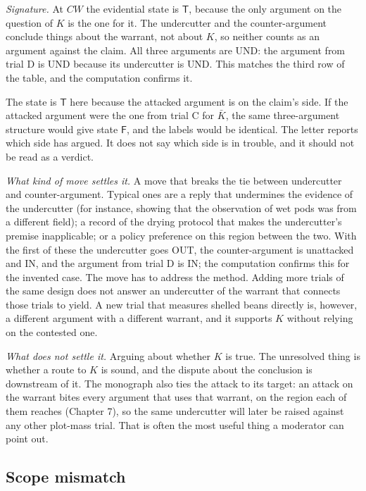 \documentclass[11pt]{article}
\newcommand{\IN}{\textsf{IN}}
\newcommand{\UND}{\textsf{UND}}
\newcommand{\OUT}{\textsf{OUT}}
\begin{document}
\emph{Signature.} At $CW$ the evidential state is $\mathsf T$, because the only argument on the question of $K$ is the one for it. The undercutter and the counter-argument conclude things about the warrant, not about $K$, so neither counts as an argument against the claim. All three arguments are \UND{}: the argument from trial D is \UND{} because its undercutter is \UND{}. This matches the third row of the table, and the computation confirms it.

The state is $\mathsf T$ here because the attacked argument is on the claim's side. If the attacked argument were the one from trial C for $\bar K$, the same three-argument structure would give state $\mathsf F$, and the labels would be identical. The letter reports which side has argued. It does not say which side is in trouble, and it should not be read as a verdict.

\emph{What kind of move settles it.} A move that breaks the tie between undercutter and counter-argument. Typical ones are a reply that undermines the evidence of the undercutter (for instance, showing that the observation of wet pods was from a different field); a record of the drying protocol that makes the undercutter's premise inapplicable; or a policy preference on this region between the two. With the first of these the undercutter goes \OUT{}, the counter-argument is unattacked and \IN{}, and the argument from trial D is \IN{}; the computation confirms this for the invented case. The move has to address the method. Adding more trials of the same design does not answer an undercutter of the warrant that connects those trials to yield. A new trial that measures shelled beans directly is, however, a different argument with a different warrant, and it supports $K$ without relying on the contested one.

\emph{What does not settle it.} Arguing about whether $K$ is true. The unresolved thing is whether a route to $K$ is sound, and the dispute about the conclusion is downstream of it. The monograph also ties the attack to its target: an attack on the warrant bites every argument that uses that warrant, on the region each of them reaches (Chapter 7), so the same undercutter will later be raised against any other plot-mass trial. That is often the most useful thing a moderator can point out.

\subsection{Scope mismatch}
\end{document}

